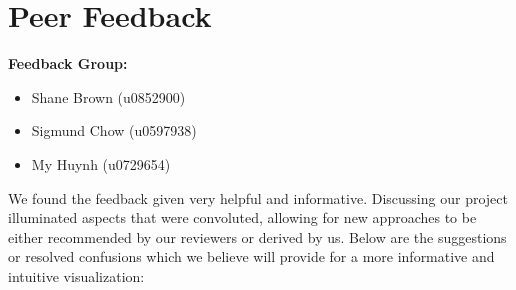 \documentclass[11pt, a4paper]{article}
\begin{document}
\section{Peer Feedback}

\textbf{Feedback Group:}
\begin{itemize}
\item Shane Brown (u0852900)
\item Sigmund Chow (u0597938)
\item My Huynh (u0729654)
\end{itemize}

We found the feedback given very helpful and informative. Discussing our project illuminated aspects that were convoluted, allowing for new approaches to be either recommended by our reviewers or derived by us. Below are the suggestions or resolved confusions which we believe will provide for a more informative and intuitive visualization:
\end{document}
